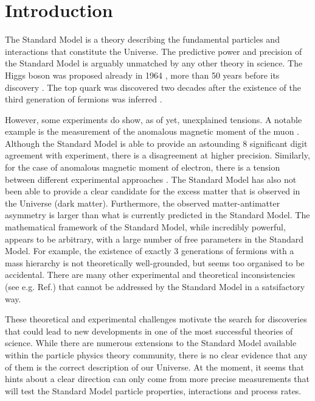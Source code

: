 \chapter{Introduction}\label{sec:introduction}

The Standard Model is a theory describing the fundamental particles and interactions that constitute the Universe.
The predictive power and precision of the Standard Model is arguably unmatched by any other theory in science.
The Higgs boson was proposed already in 1964 \cite{PhysRevLett.13.508}, more than 50 years before its discovery \cite{ATLAS:2012yve,CMS:2012qbp}.
The top quark was discovered \cite{PhysRevLett.74.2632,PhysRevLett.74.2626} two decades after the existence of the third generation of fermions was inferred \cite{HARARI1975265}.

However, some experiments do show, as of yet, unexplained tensions. 
A notable example is the measurement of the anomalous magnetic moment of the muon \cite{PhysRevLett.126.141801}.
Although the Standard Model is able to provide an astounding 8 significant digit agreement with experiment, there is a disagreement at higher precision.
Similarly, for the case of anomalous magnetic moment of electron, there is a tension between different experimental approaches \cite{PhysRevLett.100.120801,Morel:2020dww,Li:2021koa}.
The Standard Model has also not been able to provide a clear candidate for the excess matter that is observed in the Universe (dark matter).
Furthermore, the observed matter-antimatter asymmetry is larger than what is currently predicted in the Standard Model.
The mathematical framework of the Standard Model, while incredibly powerful, appears to be arbitrary, with a large number of free parameters in the Standard Model.
For example, the existence of exactly 3 generations of fermions with a mass hierarchy is not theoretically well-grounded, but seems too organised to be accidental.
There are many other experimental and theoretical inconsistencies (see e.g. Ref.\cite{Ellis:2002wba}) that cannot be addressed by the Standard Model in a satsifactory way.

These theoretical and experimental challenges motivate the search for discoveries that could lead to new developments in one of the most successful theories of science.
While there are numerous extensions to the Standard Model available within the particle physics theory community, there is no clear evidence that any of them is the correct description of our Universe.
At the moment, it seems that hints about a clear direction can only come from more precise measurements that will test the Standard Model particle properties, interactions and process rates.


